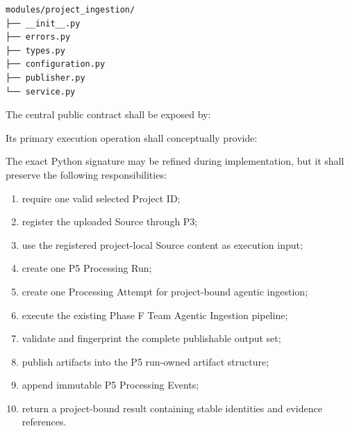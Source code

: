 \begin{verbatim}
modules/project_ingestion/
├── __init__.py
├── errors.py
├── types.py
├── configuration.py
├── publisher.py
└── service.py
\end{verbatim}

The central public contract shall be exposed by:

\begin{Shaded}
\begin{Highlighting}[]
\end{Highlighting}
\end{Shaded}

Its primary execution operation shall conceptually provide:

\begin{Shaded}
\begin{Highlighting}[]
\NormalTok{) }\OperatorTok{{-}\textgreater{}}
\end{Highlighting}
\end{Shaded}

The exact Python signature may be refined during implementation, but it shall preserve the following responsibilities:

\begin{enumerate}
\def\labelenumi{\arabic{enumi}.}
\tightlist
\item
  require one valid selected Project ID;
\item
  register the uploaded Source through P3;
\item
  use the registered project-local Source content as execution input;
\item
  create one P5 Processing Run;
\item
  create one Processing Attempt for project-bound agentic ingestion;
\item
  execute the existing Phase F Team Agentic Ingestion pipeline;
\item
  validate and fingerprint the complete publishable output set;
\item
  publish artifacts into the P5 run-owned artifact structure;
\item
  append immutable P5 Processing Events;
\item
  return a project-bound result containing stable identities and evidence references.
\end{enumerate}

